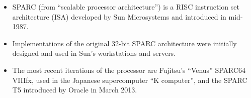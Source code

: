 \documentclass[]{article}
\begin{document}
\begin{itemize}
  \begin{itemize}
  \itemsep1pt\parskip0pt
  \item
    SPARC (from ``scalable processor architecture'') is a RISC
    instruction set architecture (ISA) developed by Sun Microsystems and
    introduced in mid-1987.
  \item
    Implementations of the original 32-bit SPARC architecture were
    initially designed and used in Sun's workstations and servers.
  \item
    The most recent iterations of the processor are Fujitsu's ``Venus''
    SPARC64 VIIIfx, used in the Japanese supercomputer ``K computer'',
    and the SPARC T5 introduced by Oracle in March 2013.
  \end{itemize}
\end{itemize}
\end{document}
